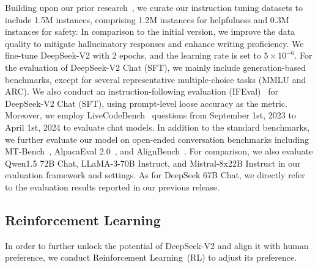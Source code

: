\documentclass[11pt, a4paper, logo, copyright, nonumbering]{deepseek}
\newcommand{\dsvic}{DeepSeek 67B Chat}
\newcommand{\dsvii}{DeepSeek-V2}
\newcommand{\dsviisft}{DeepSeek-V2 Chat (SFT)}
\begin{document}
\begin{CJK*}{UTF8}{gbsn}
Building upon our prior research~\citep{deepseek1}, we curate our instruction tuning datasets to include 1.5M instances, comprising 1.2M instances for helpfulness and 0.3M instances for safety. 
In comparison to the initial version, we improve the data quality to mitigate hallucinatory responses and enhance writing proficiency. 
We fine-tune \dsvii{} with 2 epochs, and the learning rate is set to $5 \times 10^{-6}$. 
For the evaluation of \dsviisft{}, we mainly include generation-based benchmarks, except for several representative multiple-choice tasks (MMLU and ARC). 
We also conduct an instruction-following evaluation (IFEval)~\citep{IFeval} for \dsviisft{}, using prompt-level loose accuracy as the metric. 
Moreover, we employ LiveCodeBench~\citep{jain2024livecodebench} questions from September 1st, 2023 to April 1st, 2024 to evaluate chat models. 
In addition to the standard benchmarks, we further evaluate our model on open-ended conversation benchmarks including MT-Bench~\citep{mtbench}, AlpacaEval 2.0~\citep{alpaca2.0}, and AlignBench~\citep{align_bench}. 
For comparison, we also evaluate Qwen1.5 72B Chat, LLaMA-3-70B Instruct, and Mistral-8x22B Instruct in our evaluation framework and settings. 
As for \dsvic{}, we directly refer to the evaluation results reported in our previous release. 

\subsection{Reinforcement Learning}

In order to further unlock the potential of \dsvii{} and align it with human preference, we conduct Reinforcement Learning~(RL) to adjust its preference. 


\end{CJK*}
\end{document}
